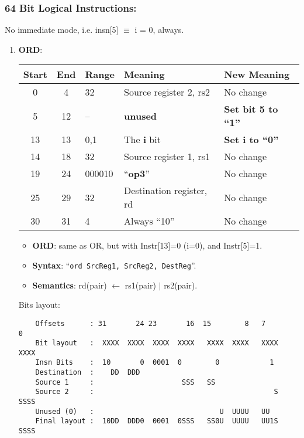 \subsubsection{64 Bit Logical Instructions:}
\label{sec:64:bit:logical:insn:impl}

No immediate mode, i.e. insn[5] $\equiv$ i = 0, always.

\begin{enumerate}
\item \textbf{ORD}:\\
  \begin{center}
    \begin{tabular}[p]{|c|c|l|l|l|}
      \hline
      \textbf{Start} & \textbf{End} & \textbf{Range} & \textbf{Meaning} &
                                                                          \textbf{New Meaning}\\
      \hline
      0 & 4 & 32 & Source register 2, rs2 & No change \\
      5 & 12 & -- & \textbf{unused} & \textbf{Set bit 5 to ``1''} \\
      13 & 13 & 0,1 & The \textbf{i} bit & \textbf{Set i to ``0''} \\
      14 & 18 & 32 & Source register 1, rs1 & No change \\
      19 & 24 & 000010 & ``\textbf{op3}'' & No change \\
      25 & 29 & 32 & Destination register, rd & No change \\
      30 & 31 & 4 & Always ``10'' & No change \\
      \hline
    \end{tabular}
  \end{center}
  \begin{itemize}
  \item []\textbf{ORD}: same as OR, but with Instr[13]=0 (i=0), and
    Instr[5]=1.
  \item []\textbf{Syntax}: ``\texttt{ord  SrcReg1, SrcReg2, DestReg}''.
  \item []\textbf{Semantics}: rd(pair) $\leftarrow$ rs1(pair) $\vert$ rs2(pair).
  \end{itemize}
  Bits layout:
\begin{verbatim}
    Offsets      : 31       24 23       16  15        8   7        0
    Bit layout   :  XXXX  XXXX  XXXX  XXXX   XXXX  XXXX   XXXX  XXXX
    Insn Bits    :  10       0  0001  0        0            1       
    Destination  :    DD  DDD                                       
    Source 1     :                     SSS   SS
    Source 2     :                                           S  SSSS
    Unused (0)   :                              U  UUUU   UU        
    Final layout :  10DD  DDD0  0001  0SSS   SS0U  UUUU   UU1S  SSSS
\end{verbatim}


\end{enumerate}
